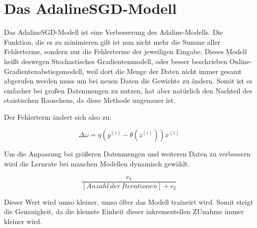 \documentclass[11pt]{article} %
\begin{document}
\section{Das AdalineSGD-Modell}
Das AdalineSGD-Modell ist eine Verbesserung des Adaline-Modells. Die Funktion, die es zu minimieren gilt ist nun nicht mehr die Summe
aller Fehlerterme, sondern nur die Fehlerterme der jeweiligen Eingabe. Dieses Modell heißt deswegen Stochastisches Gradientenmodell, oder besser beschrieben Online-Gradientenabstiegsmodell, weil dort die Menge der Daten nicht immer gesamt abgerufen werden muss um bei neuen
Daten die Gewichte zu ändern. Somit ist es einfacher bei großen Datenmengen zu nutzen, hat aber natürlich den Nachteil des staistischen Rauschens, da diese Methode ungenauer ist.

Der Fehlerterm ändert sich also zu:

\begin{equation}
\Delta \omega = \eta (y^{(i)} - \theta{(z^{(i)})}) x^{(i)}
\end{equation}

Um die Anpassung bei größeren Datenmengen und weiteren Daten zu verbessern wird die Lernrate bei manchen Modellen dynamisch gewählt.

\begin{equation}
\frac{c_1}{[Anzahl\:der\:Iterationen] + c_2}
\end{equation}

Dieser Wert wird umso kleiner, umso öfter das Modell traineirt wird. Somit steigt die Genauigkeit, da die kleinste Einheit dieser inkrementellen ZUnahme immer kleiner wird.
\end{document}
